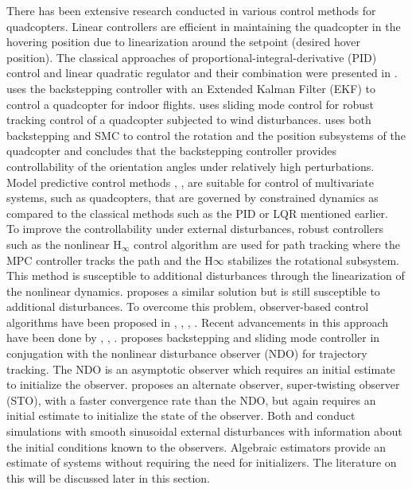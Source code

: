 \documentclass[letterpaper%
, twoside%
, 12pt%
,memoire%
, english%
,creativecommons,hyperref%
]{thETS}
\begin{document}
\begin{introduction}
There has been extensive research conducted in various control methods for quadcopters. Linear controllers are efficient in maintaining the quadcopter in the hovering position due to linearization around the setpoint (desired hover position). The classical approaches of proportional-integral-derivative (PID) control and linear quadratic regulator and their combination were presented in \citep{RN99}. \citep{RN100} uses the backstepping controller with an Extended Kalman Filter (EKF) to control a quadcopter for indoor flights. \citep{RN102} uses sliding mode control for robust tracking control of a quadcopter subjected to wind disturbances. \citep{RN103} uses both backstepping and SMC to control the rotation and the position subsystems of the quadcopter and concludes that the backstepping controller provides controllability of the orientation angles under relatively high perturbations. Model predictive control methods \citep{RN104}, \citep{RN105}, \citep{RN106} are suitable for control of multivariate systems, such as quadcopters, that are governed by constrained dynamics as compared to the classical methods such as the PID or LQR mentioned earlier. \\
To improve the controllability under external disturbances, robust controllers such as the nonlinear H$_\infty$ control algorithm \citep{RN108} are used for path tracking where the MPC controller tracks the path and the H$\infty$ stabilizes the rotational subsystem. This method is susceptible to additional disturbances through the linearization of the nonlinear dynamics. \citep{RN109} proposes a similar solution but is still susceptible to additional disturbances. To overcome this problem, observer-based control algorithms  have been proposed in \citep{RN110}, \citep{RN111}, \citep{RN112}, \citep{RN113}. Recent advancements in this approach have been done by \citep{RN114}, \citep{RN116}, \citep{RN117}. \citep{RN114} proposes backstepping and sliding mode controller in conjugation with the nonlinear disturbance observer (NDO) for trajectory tracking. The NDO is an asymptotic observer which requires an initial estimate to initialize the observer. \citep{RN117} proposes an alternate observer, super-twisting observer (STO), with a faster convergence rate than the NDO, but again requires an initial estimate to initialize the state of the observer. Both \citep{RN114} and \citep{RN117} conduct simulations with smooth sinusoidal external disturbances with information about the initial conditions known to the observers. 
Algebraic estimators provide an estimate of systems without requiring the need for initializers. The literature on this will be discussed later in this section.\\ 

\end{introduction}
\end{document}

